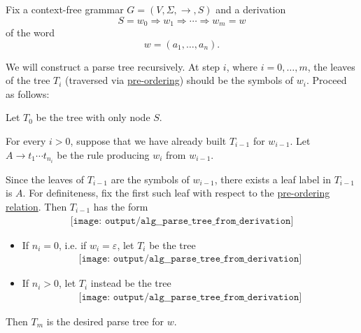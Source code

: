 \begin{algorithm}\label{alg:parse_tree_from_derivation}
  Fix a context-free grammar \( G = (V, \Sigma, \to, S) \) and a derivation
  \begin{equation*}
    S = w_0 \Rightarrow w_1 \Rightarrow \cdots \Rightarrow w_m = w
  \end{equation*}
  of the word
  \begin{equation*}
    w = (a_1, \ldots, a_n).
  \end{equation*}

  We will construct a parse tree recursively. At step \( i \), where \( i = 0, \ldots, m \), the leaves of the tree \( T_i \) (traversed via \hyperref[def:traversal_ordering]{pre-ordering}) should be the symbols of \( w_i \). Proceed as follows:
  \begin{thmenum}
     Let \( T_0 \) be the tree with only node \( S \).

     For every \( i > 0 \), suppose that we have already built \( T_{i-1} \) for \( w_{i-1} \). Let \( A \to t_1 \cdots t_{n_i} \) be the rule producing \( w_i \) from \( w_{i-1} \).

    Since the leaves of \( T_{i-1} \) are the symbols of \( w_{i-1} \), there exists a leaf label in \( T_{i-1} \) is \( A \). For definiteness, fix the first such leaf with respect to the \hyperref[def:traversal_ordering]{pre-ordering relation}. Then \( T_{i-1} \) has the form
    \begin{equation*}
      \begin{aligned}
        \texttt{[image: output/alg\_\_parse\_tree\_from\_derivation]}
      \end{aligned}
    \end{equation*}

    \begin{itemize}
      \item If \( n_i = 0 \), i.e. if \( w_i = \varepsilon \), let \( T_i \) be the tree
      \begin{equation*}
        \begin{aligned}
          \texttt{[image: output/alg\_\_parse\_tree\_from\_derivation]}
        \end{aligned}
      \end{equation*}

      \item If \( n_i > 0 \), let \( T_i \) instead be the tree
      \begin{equation*}
        \begin{aligned}
          \texttt{[image: output/alg\_\_parse\_tree\_from\_derivation]}
        \end{aligned}
      \end{equation*}
    \end{itemize}
  \end{thmenum}

  Then \( T_m \) is the desired parse tree for \( w \).
\end{algorithm}
